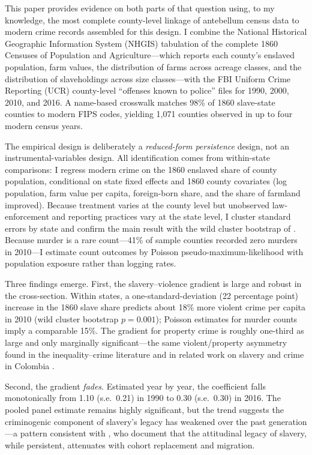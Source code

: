 \documentclass[12pt]{article}
\begin{document}
This paper provides evidence on both parts of that question using, to my knowledge, the most complete county-level linkage of antebellum census data to modern crime records assembled for this design. I combine the National Historical Geographic Information System (NHGIS) tabulation of the complete 1860 Censuses of Population and Agriculture---which reports each county's enslaved population, farm values, the distribution of farms across acreage classes, and the distribution of slaveholdings across size classes---with the FBI Uniform Crime Reporting (UCR) county-level ``offenses known to police'' files for 1990, 2000, 2010, and 2016. A name-based crosswalk matches 98\% of 1860 slave-state counties to modern FIPS codes, yielding 1,071 counties observed in up to four modern census years.

The empirical design is deliberately a \emph{reduced-form persistence} design, not an instrumental-variables design. All identification comes from within-state comparisons: I regress modern crime on the 1860 enslaved share of county population, conditional on state fixed effects and 1860 county covariates (log population, farm value per capita, foreign-born share, and the share of farmland improved). Because treatment varies at the county level but unobserved law-enforcement and reporting practices vary at the state level, I cluster standard errors by state and confirm the main result with the wild cluster bootstrap of \citet{cgm2008}. Because murder is a rare count---41\% of sample counties recorded zero murders in 2010---I estimate count outcomes by Poisson pseudo-maximum-likelihood with population exposure \citep{santossilva2006} rather than logging rates.

Three findings emerge. First, the slavery--violence gradient is large and robust in the cross-section. Within states, a one-standard-deviation (22 percentage point) increase in the 1860 slave share predicts about 18\% more violent crime per capita in 2010 (wild cluster bootstrap $p = 0.001$); Poisson estimates for murder counts imply a comparable 15\%. The gradient for property crime is roughly one-third as large and only marginally significant---the same violent/property asymmetry found in the inequality--crime literature \citep{kelly2000} and in related work on slavery and crime in Colombia \citep{buonanno2019}.

Second, the gradient \emph{fades}. Estimated year by year, the coefficient falls monotonically from 1.10 (s.e.\ 0.21) in 1990 to 0.30 (s.e.\ 0.30) in 2016. The pooled panel estimate remains highly significant, but the trend suggests the criminogenic component of slavery's legacy has weakened over the past generation---a pattern consistent with \citet{abs2016}, who document that the attitudinal legacy of slavery, while persistent, attenuates with cohort replacement and migration.
\end{document}
